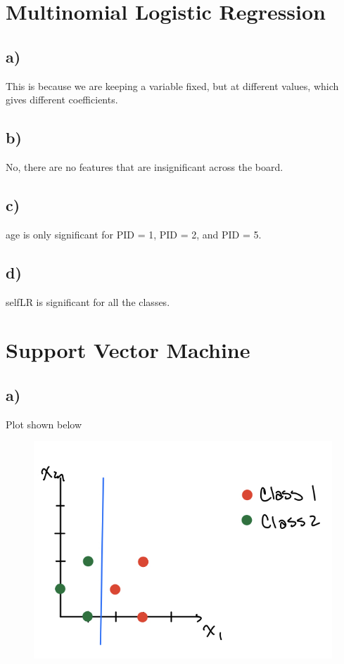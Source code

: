 \documentclass[12pt, letterpaper]{article}
\begin{document}
\newpage
\section{Multinomial Logistic Regression}
\subsection*{a)} This is because we are keeping a variable fixed, but at different values, which gives different coefficients.

\subsection*{b)} No, there are no features that are insignificant across the board.

\subsection*{c)} age is only significant for PID = 1, PID = 2, and PID = 5.

\subsection*{d)} selfLR is significant for all the classes.

\newpage
\section{Support Vector Machine}
\subsection*{a)} Plot shown below
\FloatBarrier
\begin{figure}[h!]
  \includegraphics[scale=0.33]{./images/8a.jpg}
\end{figure}
\end{document}
